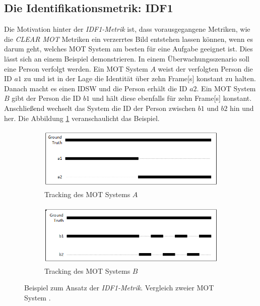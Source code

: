 \subsection{Die Identifikationsmetrik: IDF1} \label{sec:MOT F1}
Die Motivation hinter der \textit{\gls{IDF1}-Metrik} ist, dass vorausgegangene Metriken, wie die \textit{\acrshort{CLEAR} \gls{MOT}} Metriken ein verzerrtes Bild entstehen lassen können, wenn es darum geht, welches \gls{MOT} System am besten für eine Aufgabe geeignet ist. Dies lässt sich an einem Beispiel demonstrieren. In einem Überwachungsszenario soll eine Person verfolgt werden. Ein \gls{MOT} System \(A\) weist der verfolgten Person die \acrshort{ID} \(a1\) zu und ist in der Lage die Identität über zehn \gls{Frame}[s] konstant zu halten. Danach macht es einen \gls{IDSW} und die Person erhält die \acrshort{ID} \(a2\). Ein \gls{MOT} System \(B\) gibt der Person die \acrshort{ID} \(b1\) und hält diese ebenfalls für zehn \gls{Frame}[s] konstant. Anschließend wechselt das System die \acrshort{ID} der Person zwischen \(b1\) und \(b2\) hin und her. Die Abbildung \ref{fig:bspIDF1vsMOTA} veranschaulicht das Beispiel.

\begin{figure}[htb]
     \centering
     \begin{subfigure}[b]{0.49\textwidth}
         \centering
         \includegraphics[width=\textwidth, height=3cm]{img/Grafiken/IDF1 bsp Motivation 1.png}
         \caption{Tracking des MOT Systems \(A\)}
     \end{subfigure}
     \hfill
     \begin{subfigure}[b]{0.49\textwidth}
         \centering
         \includegraphics[width=\textwidth, height=3cm]{img/Grafiken/IDF1 bsp Motivation 2.png}
         \caption{Tracking des MOT Systems \(B\)}
     \end{subfigure}
     \caption[Beispiel zum Ansatz der \textit{\gls{IDF1}-Metrik}.]{Beispiel zum Ansatz der \textit{\gls{IDF1}-Metrik}. Vergleich zweier MOT System \cite{HOTA}.}
     \label{fig:bspIDF1vsMOTA}
\end{figure}

